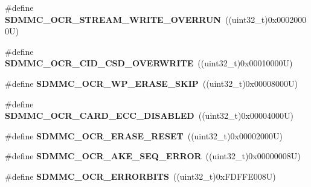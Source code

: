 \begin{DoxyCompactItemize}
\#define {\bfseries S\+D\+M\+M\+C\+\_\+\+O\+C\+R\+\_\+\+S\+T\+R\+E\+A\+M\+\_\+\+W\+R\+I\+T\+E\+\_\+\+O\+V\+E\+R\+R\+UN}~((uint32\+\_\+t)0x00020000\+U)
\item 
\mbox{\label{group___s_d_m_m_c___l_l___exported___constants_ga8c28f9991434a4f2c0bd3331a3cbfa25}} 
\#define {\bfseries S\+D\+M\+M\+C\+\_\+\+O\+C\+R\+\_\+\+C\+I\+D\+\_\+\+C\+S\+D\+\_\+\+O\+V\+E\+R\+W\+R\+I\+TE}~((uint32\+\_\+t)0x00010000\+U)
\item 
\mbox{\label{group___s_d_m_m_c___l_l___exported___constants_ga344f98c0625e84a844a193e5bc1c3e57}} 
\#define {\bfseries S\+D\+M\+M\+C\+\_\+\+O\+C\+R\+\_\+\+W\+P\+\_\+\+E\+R\+A\+S\+E\+\_\+\+S\+K\+IP}~((uint32\+\_\+t)0x00008000\+U)
\item 
\mbox{\label{group___s_d_m_m_c___l_l___exported___constants_ga0b41a20f6ead7d6622796fed1273db78}} 
\#define {\bfseries S\+D\+M\+M\+C\+\_\+\+O\+C\+R\+\_\+\+C\+A\+R\+D\+\_\+\+E\+C\+C\+\_\+\+D\+I\+S\+A\+B\+L\+ED}~((uint32\+\_\+t)0x00004000\+U)
\item 
\mbox{\label{group___s_d_m_m_c___l_l___exported___constants_ga5b16250a812cc042e29674f399201a1b}} 
\#define {\bfseries S\+D\+M\+M\+C\+\_\+\+O\+C\+R\+\_\+\+E\+R\+A\+S\+E\+\_\+\+R\+E\+S\+ET}~((uint32\+\_\+t)0x00002000\+U)
\item 
\mbox{\label{group___s_d_m_m_c___l_l___exported___constants_ga8cd65e38393ec5544d5b8d2806e9ac3e}} 
\#define {\bfseries S\+D\+M\+M\+C\+\_\+\+O\+C\+R\+\_\+\+A\+K\+E\+\_\+\+S\+E\+Q\+\_\+\+E\+R\+R\+OR}~((uint32\+\_\+t)0x00000008\+U)
\item 
\mbox{\label{group___s_d_m_m_c___l_l___exported___constants_gaa8ec57598bf10101ab12536c42752bad}} 
\#define {\bfseries S\+D\+M\+M\+C\+\_\+\+O\+C\+R\+\_\+\+E\+R\+R\+O\+R\+B\+I\+TS}~((uint32\+\_\+t)0x\+F\+D\+F\+F\+E008\+U)
\item 
\mbox{\label{group___s_d_m_m_c___l_l___exported___constants_ga0410a94052f5601814d5254de59e740b}} 

\end{DoxyCompactItemize}
